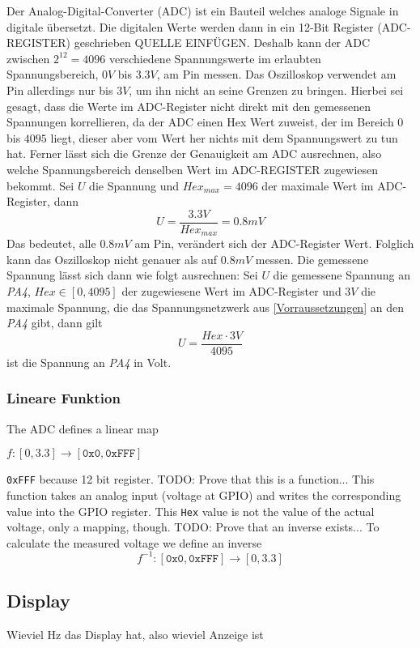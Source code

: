 Der Analog-Digital-Converter (ADC) ist ein Bauteil welches analoge Signale in digitale übersetzt. \newline
Die digitalen Werte werden dann in ein 12-Bit Register (ADC-REGISTER) geschrieben QUELLE EINFÜGEN.
Deshalb kann der ADC zwischen $2^{12} = 4096$ verschiedene Spannungswerte im erlaubten Spannungsbereich, $0V$ bis $3.3V$, am Pin messen.
Das Oszilloskop verwendet am Pin allerdings nur bis $3V$, um ihn nicht an seine Grenzen zu bringen. \newline
Hierbei sei gesagt, dass die Werte im ADC-Register nicht direkt mit den gemessenen Spannungen korrellieren,
da der ADC einen Hex Wert zuweist, der im Bereich $0$ bis $4095$ liegt, dieser aber vom Wert her nichts mit
dem Spannungswert zu tun hat. \newline
Ferner lässt sich die Grenze der Genauigkeit am ADC ausrechnen, also welche Spannungsbereich denselben
Wert im ADC-REGISTER zugewiesen bekommt.
Sei $U$ die Spannung und $Hex_{max} = 4096$ der maximale Wert im ADC-Register,
dann
$$U = \frac{3.3V}{Hex_{max}} = 0.8mV$$
Das bedeutet, alle $0.8mV$ am Pin, verändert sich der ADC-Register Wert. \newline
Folglich kann das Oszilloskop nicht genauer als auf $0.8mV$ messen. \newpage \noindent
Die gemessene Spannung lässt sich dann wie folgt ausrechnen: \newline
Sei $U$ die gemessene Spannung an \textit{PA4}, $Hex \in [0, 4095]$ der zugewiesene Wert im ADC-Register
und $3V$ die maximale Spannung, die das Spannungsnetzwerk aus \ref{Vorraussetzungen} an den \textit{PA4} gibt,
dann gilt
$$U = \frac{Hex \cdot 3V}{4095}$$
ist die Spannung an \textit{PA4} in Volt.

\subsubsection{Lineare Funktion}
The ADC defines a linear map
\begin{center}
	$f: [0,3.3] \rightarrow [\texttt{0x0}, \texttt{0xFFF}]$
\end{center}
\texttt{0xFFF} because 12 bit register. \newline
TODO: Prove that this is a function... \newline
This function takes an analog input (voltage at GPIO) and writes the corresponding value into the GPIO register. \newline
This \texttt{Hex} value is not the value of the actual voltage, only a mapping, though.
TODO: Prove that an inverse exists... \newline
To calculate the measured voltage we define an inverse
$$
	f^{-1}: [\texttt{0x0}, \texttt{0xFFF}] \rightarrow [0, 3.3]
$$

\subsection{Display}

Wieviel Hz das Display hat, also wieviel Anzeige ist